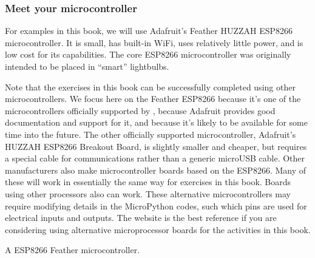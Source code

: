 \subsubsection{Meet your microcontroller}


For examples in this book, we will use Adafruit's Feather HUZZAH ESP8266 microcontroller. 
It is small, has built-in WiFi, uses relatively little power, and is low cost for its capabilities. 
The core ESP8266 microcontroller was originally intended to be placed in ``smart'' lightbulbs.

Note that the exercises in this book can be successfully completed using other microcontrollers. 
We focus here on the Feather ESP8266 because it's one of the microcontrollers officially supported by , because Adafruit provides good documentation and support for it, and because it's likely to be available for some time into the future.
The other officially supported microcontroller, Adafruit's HUZZAH ESP8266 Breakout Board, is slightly smaller and cheaper, but requires a special cable for communications rather than a generic microUSB cable.
Other manufacturers also make microcontroller boards based on the ESP8266. 
Many of these will work in essentially the same way for exercises in this book. 
Boards using other processors also can work. 
These alternative microcontrollers may require modifying details in the MicroPython codes, such which pins are used for electrical inputs and outputs. 
The  website is the best reference if you are considering using alternative microprocessor boards for the activities in this book.

\begin{marginfigure}[2cm]
	\begin{center}
		\caption[ESP8266 feather microcontroller]{A ESP8266 Feather microcontroller.}
	\end{center}
\end{marginfigure}

